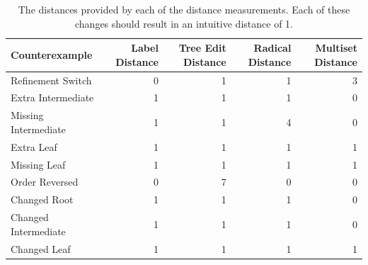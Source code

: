\begin{table}
    \begin{tabular}{lrrrr}
        \toprule
        Counterexample       & Label Distance & Tree Edit Distance & Radical Distance & Multiset Distance \\
        \midrule
        Refinement Switch    & 0              & 1                  & 1                & 3                 \\
        Extra Intermediate   & 1              & 1                  & 1                & 0                 \\
        Missing Intermediate & 1              & 1                  & 4                & 0                 \\
        Extra Leaf           & 1              & 1                  & 1                & 1                 \\
        Missing Leaf         & 1              & 1                  & 1                & 1                 \\
        Order Reversed       & 0              & 7                  & 0                & 0                 \\
        Changed Root         & 1              & 1                  & 1                & 0                 \\
        Changed Intermediate & 1              & 1                  & 1                & 0                 \\
        Changed Leaf         & 1              & 1                  & 1                & 1                 \\
        \bottomrule
    \end{tabular}
    \caption{The distances provided by each of the distance measurements. Each of these changes should result in an intuitive distance of 1.}
    \label{tab:counterexamples}
\end{table}











